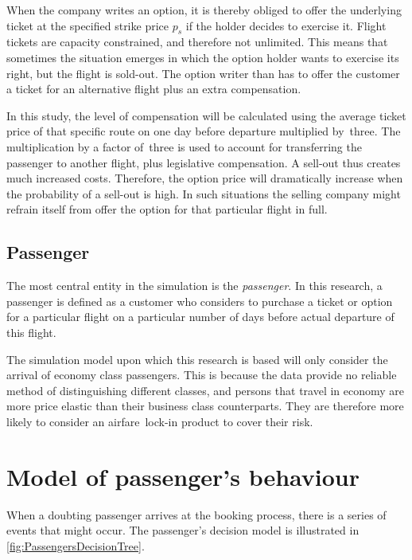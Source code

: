 When the company writes an option, it is thereby obliged to offer the underlying ticket at the specified strike price $p_s$ if the holder decides to exercise it. Flight tickets are capacity constrained, and therefore not unlimited. This means that sometimes the situation emerges in which the option holder wants to exercise its right, but the flight is sold-out. The option writer than has to offer the customer a ticket for an alternative flight plus an extra compensation.

In this study, the level of compensation will be calculated using the average ticket price of that specific route on one day before departure multiplied by~three. The multiplication by a factor of~three is used to account for transferring the passenger to another flight, plus legislative compensation. A sell-out thus creates much increased costs. Therefore, the option price will dramatically increase when the probability of a sell-out is high. In such situations the selling company might refrain itself from offer the option for that particular flight in full.


\subsection{Passenger}
\label{sec:Passenger}
The most central entity in the simulation is the \emph{passenger}.  In this research, a passenger is defined as a customer who considers to purchase a ticket or option for a particular flight on a particular number of days before actual departure of this flight. 

The simulation model upon which this research is based will only consider the arrival of economy class passengers. This is because the data provide no reliable method of distinguishing different classes, and persons that travel in economy are more price elastic than their business class counterparts. They are therefore more likely to consider an airfare~lock-in product to cover their risk.

\section{Model of passenger's behaviour}
When a doubting passenger arrives at the booking process, there is a series of events that might occur. The passenger's decision model is illustrated in \autoref{fig:PassengersDecisionTree}.

